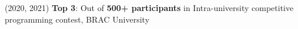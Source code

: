 (2020, 2021) \textbf{Top 3}{: Out of \textbf{500+ participants} in Intra-university competitive programming contest, BRAC University}